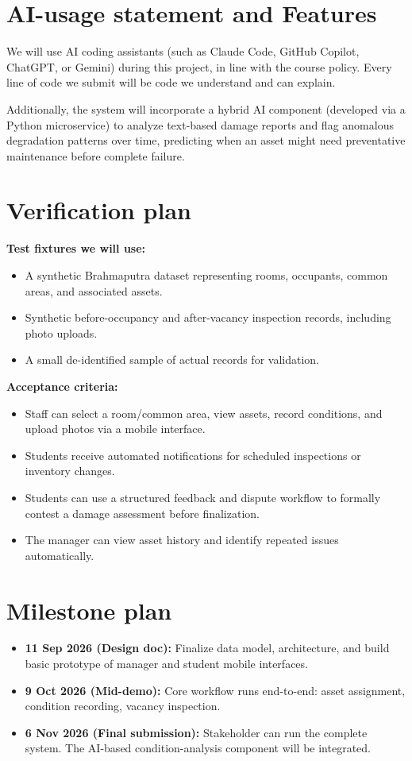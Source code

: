 \documentclass[11pt,a4paper]{article}
\begin{document}
\section{AI-usage statement and Features}
We will use AI coding assistants (such as Claude Code, GitHub Copilot, ChatGPT, or Gemini) during this project, in line with the course policy. Every line of code we submit will be code we understand and can explain. 

Additionally, the system will incorporate a hybrid AI component (developed via a Python microservice) to analyze text-based damage reports and flag anomalous degradation patterns over time, predicting when an asset might need preventative maintenance before complete failure.

\section{Verification plan}
\textbf{Test fixtures we will use:}
\begin{itemize}[noitemsep]
    \item A synthetic Brahmaputra dataset representing rooms, occupants, common areas, and associated assets.
    \item Synthetic before-occupancy and after-vacancy inspection records, including photo uploads.
    \item A small de-identified sample of actual records for validation.
\end{itemize}
\textbf{Acceptance criteria:}
\begin{itemize}[noitemsep]
    \item Staff can select a room/common area, view assets, record conditions, and upload photos via a mobile interface.
    \item Students receive automated notifications for scheduled inspections or inventory changes.
    \item Students can use a structured feedback and dispute workflow to formally contest a damage assessment before finalization.
    \item The manager can view asset history and identify repeated issues automatically.
\end{itemize}

\section{Milestone plan}
\begin{itemize}[noitemsep]
    \item \textbf{11 Sep 2026 (Design doc):} Finalize data model, architecture, and build basic prototype of manager and student mobile interfaces.
    \item \textbf{9 Oct 2026 (Mid-demo):} Core workflow runs end-to-end: asset assignment, condition recording, vacancy inspection.
    \item \textbf{6 Nov 2026 (Final submission):} Stakeholder can run the complete system. The AI-based condition-analysis component will be integrated.
\end{itemize}
\end{document}

